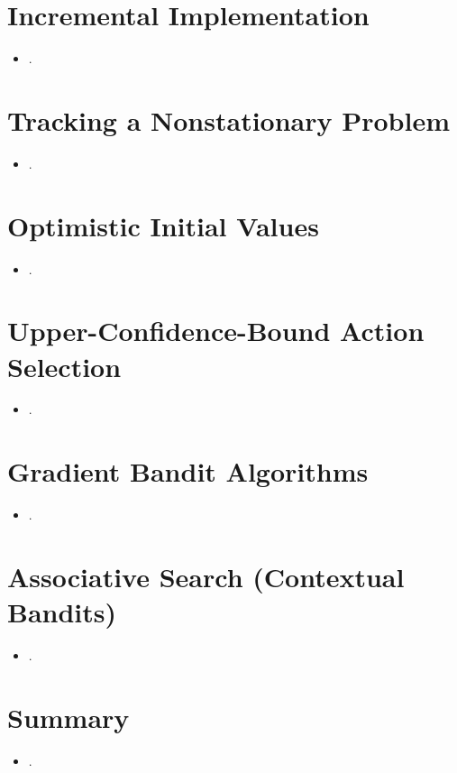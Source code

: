 \documentclass{article}
\begin{document}
\section{Incremental Implementation}
\begin{itemize}
    \item .
\end{itemize}

\section{Tracking a Nonstationary Problem}
\begin{itemize}
    \item .
\end{itemize}

\section{Optimistic Initial Values}
\begin{itemize}
    \item .
\end{itemize}

\section{Upper-Confidence-Bound Action Selection}
\begin{itemize}
    \item .
\end{itemize}

\section{Gradient Bandit Algorithms}
\begin{itemize}
    \item .
\end{itemize}

\section{Associative Search (Contextual Bandits)}
\begin{itemize}
    \item .
\end{itemize}

\section{Summary}
\begin{itemize}
    \item .
\end{itemize}
\end{document}
